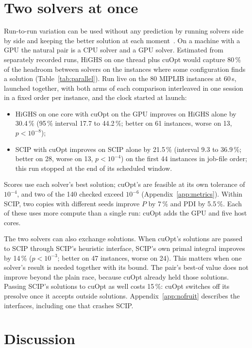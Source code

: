 \documentclass[11pt]{article}
\begin{document}
\section{Two solvers at once}\label{sec:parallel}
Run-to-run variation can be used without any prediction by running solvers side by side and keeping the better
solution at each moment~\citep{gomes2001portfolios,mexi2026rexi}. On a machine with a GPU the natural pair is a CPU
solver and a GPU solver. Estimated from separately recorded runs, HiGHS on one thread plus cuOpt would capture 80\,\%
of the headroom between solvers on the instances where some configuration finds a solution (Table~\ref{tab:parallel}).
Run live on the 80 MIPLIB instances at 60\,s, launched together, with both arms of each comparison interleaved in one
session in a fixed order per instance, and the clock started at launch:
\begin{itemize}
\item HiGHS on one core with cuOpt on the GPU improves on HiGHS alone by 30.4\,\% (95\,\% interval 17.7 to 44.2\,\%;
  better on 61 instances, worse on 13, $p<10^{-8}$);
\item SCIP with cuOpt improves on SCIP alone by 21.5\,\% (interval 9.3 to 36.9\,\%; better on 28, worse on 13,
  $p<10^{-4}$) on the first 44
  instances in job-file order; this run stopped at the end of its scheduled window.
\end{itemize}
Scores use each solver's best solution; cuOpt's are feasible at its own tolerance of $10^{-4}$, and two of the 140
checked exceed $10^{-6}$ (Appendix~\ref{app:metrics}).
Within SCIP, two copies with different seeds improve $P$ by 7\,\% and PDI by 5.5\,\%. Each of these uses more compute
than a single run: cuOpt adds the GPU and five host cores.

The two solvers can also exchange solutions. When cuOpt's solutions are passed to SCIP through SCIP's heuristic
interface, SCIP's own primal integral improves by 14\,\% ($p<10^{-3}$; better on 47 instances, worse on 24). This
matters when one solver's result is needed together with its bound. The pair's best-of value does not improve beyond
the plain race, because cuOpt already held those solutions. Passing SCIP's solutions to cuOpt as well costs 15\,\%:
cuOpt switches off its presolve once it accepts outside solutions. Appendix~\ref{app:nofruit} describes the interfaces,
including one that crashes SCIP.


\section{Discussion}
\end{document}
